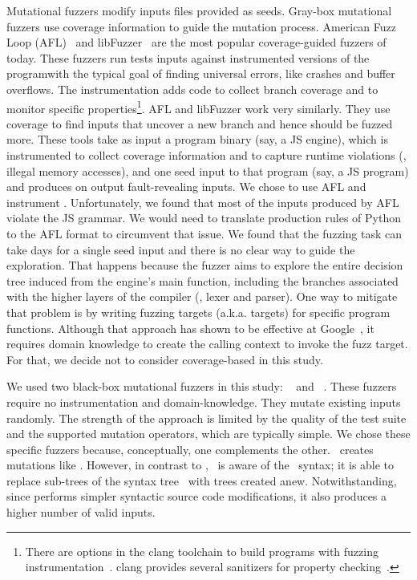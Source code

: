 \documentclass[smallextended]{svjour3}
\begin{document}

Mutational fuzzers modify inputs files provided as seeds. Gray-box
mutational fuzzers use coverage information to guide the mutation
process. American Fuzz Loop (AFL)~\cite{afl} and
libFuzzer~\cite{libfuzzer} are the most popular coverage-guided
fuzzers of today. These fuzzers run tests inputs against instrumented
versions of the programwith the typical goal of finding universal
errors, like crashes and buffer overflows. The instrumentation adds
code to collect branch coverage and to monitor specific
properties\footnote{There are options in the clang toolchain to build
  programs with fuzzing instrumentation~\cite{libfuzzer}. clang
  provides several sanitizers for property
  checking~\cite{clang-documentation}.}. AFL and libFuzzer work very
similarly. They use coverage to find inputs that uncover a new branch
and hence should be fuzzed more. These tools take as input a program
binary (say, a JS engine), which is instrumented to collect coverage
information and to capture runtime violations (\eg{}, illegal memory
accesses), and one seed input to that program (say, a JS program) and
produces on output fault-revealing inputs. We chose to use AFL and
instrument \veight. Unfortunately, we found that most of the inputs
produced by AFL violate the JS grammar. We would need to translate
production rules of Python to the AFL format to circumvent that
issue. We found that the fuzzing task can take days for a single seed
input and there is no clear way to guide the exploration. That happens
because the fuzzer aims to explore the entire decision tree induced
from the engine's main function, including the branches associated
with the higher layers of the compiler (\eg{}, lexer and parser). One
way to mitigate that problem is by writing fuzzing targets
(a.k.a. targets) for specific program functions. Although that
approach has shown to be effective at
Google~\cite{libFuzzer-tutorial-google,libFuzzer-chromium-google}, it
requires domain knowledge to create the calling context to invoke the
fuzz target. For that, we decide not to consider coverage-based in
this study.

We used two black-box mutational fuzzers in this
study: \radamsa~\cite{radamsa} and \quickfuzz~\cite{quickfuzz}. These
fuzzers require no instrumentation and domain-knowledge. They mutate
existing inputs randomly. The strength of the approach is
limited by the quality of the test suite and the supported mutation
operators, which are typically simple. We chose these specific fuzzers
because, conceptually, one complements the other. \quickfuzz\ creates
mutations like \radamsa. However, in contrast to \radamsa, \quickfuzz\ is aware
of the \js\ syntax; it is able to replace sub-trees of the syntax
tree~\cite{grieco2016quickfuzz} with trees created anew. Notwithstanding,
since \radamsa performs simpler syntactic source code modifications,
it also produces a higher number of valid inputs.
\end{document}
